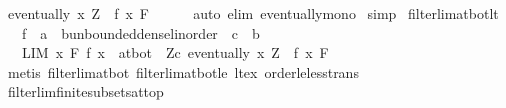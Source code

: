 \begin{isabellebody}
\ {\isachardoublequoteopen}eventually\ {\isacharparenleft}{\kern0pt}{\isasymlambda}x{\isachardot}{\kern0pt}\ Z\ {\isasymge}\ f\ x{\isacharparenright}{\kern0pt}\ F{\isachardoublequoteclose}\isanewline
\ \ \ \ \isamarkupfalse%
\ {\isacharparenleft}{\kern0pt}auto\ elim{\isacharbang}{\kern0pt}{\isacharcolon}{\kern0pt}\ eventually{\isacharunderscore}{\kern0pt}mono{\isacharparenright}{\kern0pt}\isanewline
{}\isamarkupfalse%
\ simp%
\endisatagproof
{\isafoldproof}%
%
\isadelimproof
\isanewline
%
\endisadelimproof
\isanewline
{}\isamarkupfalse%
\ filterlim{\isacharunderscore}{\kern0pt}at{\isacharunderscore}{\kern0pt}bot{\isacharunderscore}{\kern0pt}lt{\isacharcolon}{\kern0pt}\isanewline
\ \ \ f\ {\isacharcolon}{\kern0pt}{\isacharcolon}{\kern0pt}\ {\isachardoublequoteopen}{\isacharprime}{\kern0pt}a\ {\isasymRightarrow}\ {\isacharparenleft}{\kern0pt}{\isacharprime}{\kern0pt}b{\isacharcolon}{\kern0pt}{\isacharcolon}{\kern0pt}unbounded{\isacharunderscore}{\kern0pt}dense{\isacharunderscore}{\kern0pt}linorder{\isacharparenright}{\kern0pt}{\isachardoublequoteclose}\ \ c\ {\isacharcolon}{\kern0pt}{\isacharcolon}{\kern0pt}\ {\isachardoublequoteopen}{\isacharprime}{\kern0pt}b{\isachardoublequoteclose}\isanewline
\ \ \ {\isachardoublequoteopen}{\isacharparenleft}{\kern0pt}LIM\ x\ F{\isachardot}{\kern0pt}\ f\ x\ {\isacharcolon}{\kern0pt}{\isachargreater}{\kern0pt}\ at{\isacharunderscore}{\kern0pt}bot{\isacharparenright}{\kern0pt}\ {\isasymlongleftrightarrow}\ {\isacharparenleft}{\kern0pt}{\isasymforall}Z{\isacharless}{\kern0pt}c{\isachardot}{\kern0pt}\ eventually\ {\isacharparenleft}{\kern0pt}{\isasymlambda}x{\isachardot}{\kern0pt}\ Z\ {\isasymge}\ f\ x{\isacharparenright}{\kern0pt}\ F{\isacharparenright}{\kern0pt}{\isachardoublequoteclose}\isanewline
%
\isadelimproof
\ \ %
\endisadelimproof
%
\isatagproof
{}\isamarkupfalse%
\ {\isacharparenleft}{\kern0pt}metis\ filterlim{\isacharunderscore}{\kern0pt}at{\isacharunderscore}{\kern0pt}bot\ filterlim{\isacharunderscore}{\kern0pt}at{\isacharunderscore}{\kern0pt}bot{\isacharunderscore}{\kern0pt}le\ lt{\isacharunderscore}{\kern0pt}ex\ order{\isacharunderscore}{\kern0pt}le{\isacharunderscore}{\kern0pt}less{\isacharunderscore}{\kern0pt}trans{\isacharparenright}{\kern0pt}%
\endisatagproof
{\isafoldproof}%
%
\isadelimproof
\isanewline
%
\endisadelimproof
\ \ \ \ \isanewline
{}\isamarkupfalse%
\ filterlim{\isacharunderscore}{\kern0pt}finite{\isacharunderscore}{\kern0pt}subsets{\isacharunderscore}{\kern0pt}at{\isacharunderscore}{\kern0pt}top{\isacharcolon}{\kern0pt}\isanewline

\end{isabellebody}
